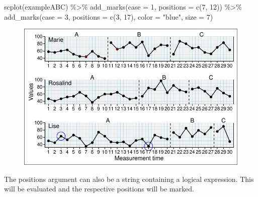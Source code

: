 \documentclass[
  letterpaper,
  DIV=11,
  numbers=noendperiod]{scrreprt}
\newenvironment{Shaded}{\begin{snugshade}}{\end{snugshade}}
\newcommand{\AttributeTok}[1]{\textcolor[rgb]{0.40,0.45,0.13}{#1}}
\newcommand{\DecValTok}[1]{\textcolor[rgb]{0.68,0.00,0.00}{#1}}
\newcommand{\FunctionTok}[1]{\textcolor[rgb]{0.28,0.35,0.67}{#1}}
\newcommand{\NormalTok}[1]{\textcolor[rgb]{0.00,0.23,0.31}{#1}}
\newcommand{\SpecialCharTok}[1]{\textcolor[rgb]{0.37,0.37,0.37}{#1}}
\newcommand{\StringTok}[1]{\textcolor[rgb]{0.13,0.47,0.30}{#1}}
\begin{document}
\begin{Shaded}
\begin{Highlighting}[]
\FunctionTok{scplot}\NormalTok{(exampleABC) }\SpecialCharTok{\%\textgreater{}\%}
  \FunctionTok{add\_marks}\NormalTok{(}\AttributeTok{case =} \DecValTok{1}\NormalTok{, }\AttributeTok{positions =} \FunctionTok{c}\NormalTok{(}\DecValTok{7}\NormalTok{, }\DecValTok{12}\NormalTok{)) }\SpecialCharTok{\%\textgreater{}\%}
  \FunctionTok{add\_marks}\NormalTok{(}\AttributeTok{case =} \DecValTok{3}\NormalTok{, }\AttributeTok{positions =} \FunctionTok{c}\NormalTok{(}\DecValTok{3}\NormalTok{, }\DecValTok{17}\NormalTok{), }\AttributeTok{color =} \StringTok{"blue"}\NormalTok{, }\AttributeTok{size =} \DecValTok{7}\NormalTok{)}
\end{Highlighting}
\end{Shaded}

\begin{figure}[H]

{\centering \includegraphics{./ch_scplot_files/figure-pdf/scplot-marks-1-1.pdf}

}

\end{figure}

The positions argument can also be a string containing a logical
expression. This will be evaluated and the respective positions will be
marked.
\end{document}
